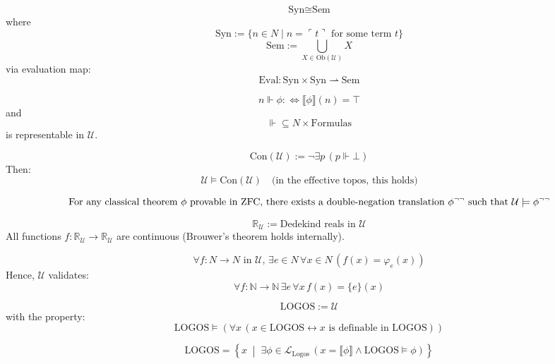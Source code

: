 \documentclass{article}
\begin{document}
\[
\text{Syn} \cong \text{Sem}
\]
where
\[
\text{Syn} := \{ n \in N \mid n = \ulcorner t \urcorner \text{ for some term } t \}
\]
\[
\text{Sem} := \bigcup_{X \in \text{Ob}(\mathcal{U})} X
\]
via evaluation map:
\[
\text{Eval} : \text{Syn} \times \text{Syn} \rightharpoonup \text{Sem}
\]

\[
n \Vdash \phi :\Leftrightarrow \llbracket \phi \rrbracket(n) = \top
\]
and
\[
\Vdash \subseteq N \times \text{Formulas}
\]
is representable in $\mathcal{U}$.

\[
\text{Con}(\mathcal{U}) := \neg \exists p \, (p \Vdash \bot)
\]
Then:
\[
\mathcal{U} \models \text{Con}(\mathcal{U}) \quad \text{(in the effective topos, this holds)}
\]

\[
\text{For any classical theorem } \phi \text{ provable in ZFC, } \\
\text{there exists a double-negation translation } \phi^{\neg\neg} \text{ such that } \mathcal{U} \models \phi^{\neg\neg}
\]

\[
\mathbb{R}_{\mathcal{U}} := \text{Dedekind reals in } \mathcal{U}
\]
All functions $f : \mathbb{R}_{\mathcal{U}} \to \mathbb{R}_{\mathcal{U}}$ are continuous (Brouwer’s theorem holds internally).

\[
\forall f : N \to N \text{ in } \mathcal{U}, \, \exists e \in N \, \forall x \in N \, (f(x) = \varphi_e(x))
\]
Hence, $\mathcal{U}$ validates:
\[
\forall f : \mathbb{N} \to \mathbb{N} \, \exists e \, \forall x \, f(x) = \{e\}(x)
\]

\[
\text{LOGOS} := \mathcal{U}
\]
with the property:
\[
\text{LOGOS} \models \left( \forall x \, (x \in \text{LOGOS} \leftrightarrow x \text{ is definable in } \text{LOGOS}) \right)
\]

\[
\boxed{ \text{LOGOS} = \left\{ x \;\middle|\; \exists \phi \in \mathcal{L}_{\text{Logos}} \, \left( x = \llbracket \phi \rrbracket \land \text{LOGOS} \models \phi \right) \right\} }
\]

\end{document}
